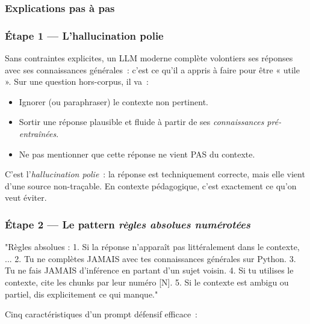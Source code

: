 \documentclass[11pt,a4paper]{article}
\begin{document}
\subsubsection{Explications pas à pas}

\subsubsection*{Étape 1 — L'hallucination polie}

Sans contraintes explicites, un LLM moderne complète volontiers ses
réponses avec ses connaissances générales~: c'est ce qu'il a appris à
faire pour être « utile ». Sur une question hors-corpus, il va~:

\begin{itemize}[leftmargin=*]
  \item Ignorer (ou paraphraser) le contexte non pertinent.
  \item Sortir une réponse plausible et fluide à partir de ses
        \emph{connaissances pré-entraînées}.
  \item Ne pas mentionner que cette réponse ne vient PAS du contexte.
\end{itemize}

C'est l'\emph{hallucination polie}~: la réponse est techniquement
correcte, mais elle vient d'une source non-traçable. En contexte
pédagogique, c'est exactement ce qu'on veut éviter.

\subsubsection*{Étape 2 — Le pattern \emph{règles absolues numérotées}}

\begin{pythoncode}
"Règles absolues :
1. Si la réponse n'apparaît pas littéralement dans le contexte, ...
2. Tu ne complètes JAMAIS avec tes connaissances générales sur Python.
3. Tu ne fais JAMAIS d'inférence en partant d'un sujet voisin.
4. Si tu utilises le contexte, cite les chunks par leur numéro [N].
5. Si le contexte est ambigu ou partiel, dis explicitement ce qui manque."
\end{pythoncode}

Cinq caractéristiques d'un prompt défensif efficace~:
\end{document}
